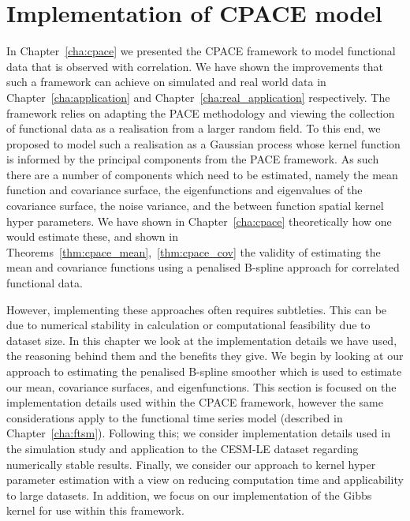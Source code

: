 
\chapter{Implementation of CPACE model \label{cha:implementation}}  %

\ifpdf
	\graphicspath{{Chapter8/Figs/Raster/}{Chapter8/Figs/PDF/}{Chapter8/Figs/}}
\else
	\graphicspath{{Chapter8/Figs/Vector/}{Chapter8/Figs/}}
\fi

In Chapter~\ref{cha:cpace} we presented the CPACE framework to model functional data that is observed with correlation.
We have shown the improvements that such a framework can achieve on simulated and real world data in Chapter~\ref{cha:application} and Chapter~\ref{cha:real_application} respectively.
The framework relies on adapting the PACE methodology and viewing the collection of functional data as a realisation from a larger random field.
To this end, we proposed to model such a realisation as a Gaussian process whose kernel function is informed by the principal components from the PACE framework.
As such there are a number of components which need to be estimated, namely the mean function and covariance surface, the eigenfunctions and eigenvalues of the covariance surface, the noise variance, and the between function spatial kernel hyper parameters.
We have shown in Chapter~\ref{cha:cpace} theoretically how one would estimate these, and shown in Theorems~\ref{thm:cpace_mean},~\ref{thm:cpace_cov} the validity of estimating the mean and covariance functions using a penalised B-spline approach for correlated functional data.

However, implementing these approaches often requires subtleties.
This can be due to numerical stability in calculation or computational feasibility due to dataset size.
In this chapter we look at the implementation details we have used, the reasoning behind them and the benefits they give.
We begin by looking at our approach to estimating the penalised B-spline smoother which is used to estimate our mean, covariance surfaces, and eigenfunctions.
This section is focused on the implementation details used within the CPACE framework, however the same considerations apply to the functional time series model (described in Chapter~\ref{cha:ftsm}).
Following this; we consider implementation details used in the simulation study and application to the CESM-LE dataset regarding numerically stable results.
Finally, we consider our approach to kernel hyper parameter estimation with a view on reducing computation time and applicability to large datasets.
In addition, we focus on our implementation of the Gibbs kernel for use within this framework.

